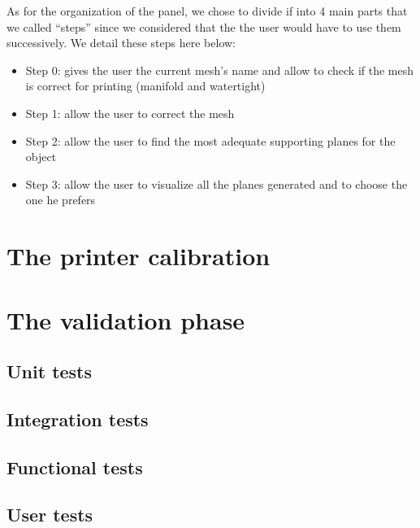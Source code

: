 \documentclass{report}
\begin{document}
As for the organization of the panel, we chose to divide if into 4 main parts that we called ``steps'' since we considered that the the user would have to use them successively. We detail these steps here below:

\begin{itemize}
\item Step 0: gives the user the current mesh's name and allow to check if the mesh is correct for printing (manifold and watertight)
\item Step 1: allow the user to correct the mesh
\item Step 2: allow the user to find the most adequate supporting planes for the object
\item Step 3: allow the user to visualize all the planes generated and to choose the one he prefers
\end{itemize}

\chapter{The printer calibration}

\chapter{The validation phase}

\section{Unit tests}

\section{Integration tests}

\section{Functional tests}

\section{User tests}


\appendix
\end{document}
